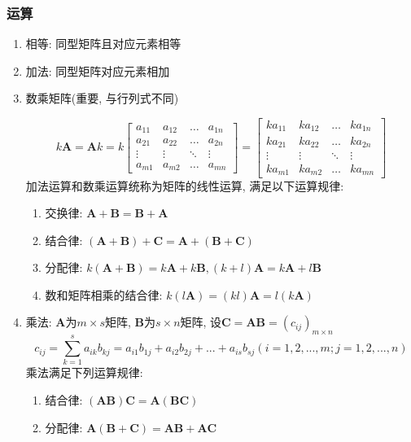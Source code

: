 \subsubsection{运算}
\begin{enumerate}
\item 相等: 同型矩阵且对应元素相等
\item 加法: 同型矩阵对应元素相加
\item 数乘矩阵(重要, 与行列式不同)\par 
\begin{equation*}
k\bm{A} = \bm{A}k = k \begin{bmatrix}
a_{11}	& a_{12}  & \dots & a_{1n} \\
a_{21}	& a_{22} & \dots & a_{2n} \\
\vdots	& \vdots & \ddots & \vdots \\
a_{m1}	& a_{m2} & \dots & a_{mn} 
\end{bmatrix} = 
\begin{bmatrix}
ka_{11}	& ka_{12}  & \dots & ka_{1n} \\
ka_{21}	& ka_{22} & \dots & ka_{2n} \\
\vdots	& \vdots & \ddots & \vdots \\
ka_{m1}	& ka_{m2} & \dots & ka_{mn} 
\end{bmatrix}
\end{equation*}
加法运算和数乘运算统称为矩阵的线性运算, 满足以下运算规律:
\begin{enumerate}
\item 交换律: $ \bm{A}+\bm{B}=\bm{B}+\bm{A} $
\item 结合律: $ (\bm{A}+\bm{B})+\bm{C}=\bm{A}+(\bm{B}+\bm{C}) $
\item 分配律: $ k(\bm{A}+\bm{B})=k\bm{A}+k\bm{B}, (k+l)\bm{A}=k\bm{A}+l\bm{B} $
\item 数和矩阵相乘的结合律: $ k(l\bm{A})=(kl)\bm{A}=l(k\bm{A}) $
\end{enumerate}
\item 乘法: $ \bm{A} $为$ m\times s $矩阵, $ \bm{B} $为$ s\times n $矩阵, 设$ \bm{C}=\bm{A}\bm{B}=(c_{ij})_{m\times n} $
\begin{equation*}
c_{ij}=\sum_{k=1}^{s}a_{ik}b_{kj}=a_{i1}b_{1j}+a_{i2}b_{2j}+...+a_{is}b_{sj}(i=1,2,...,m;j=1,2,...,n)
\end{equation*}
乘法满足下列运算规律:
\begin{enumerate}
\item 结合律: $ (\bm{A}\bm{B})\bm{C}=\bm{A}(\bm{B}\bm{C}) $
\item 分配律: $ \bm{A}(\bm{B}+\bm{C})=\bm{A}\bm{B}+\bm{A}\bm{C} $

\end{enumerate}
\end{enumerate}

